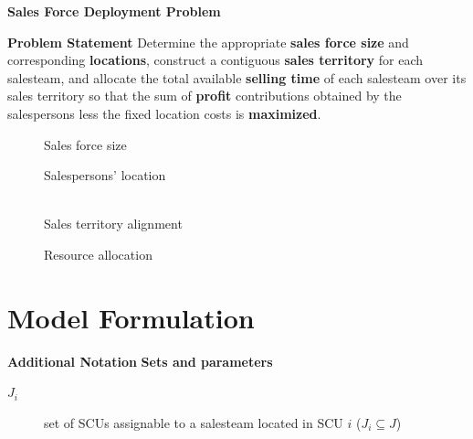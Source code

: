 \documentclass[xcolor=dvipsnames,aspectratio=169, handout, mathserif]{beamer}
\begin{document}
\begin{frame}{\textbf{Sales Force Deployment Problem}}
\begin{block}{\textbf{Problem Statement}}
Determine the appropriate \textbf{sales force size} and corresponding \textbf{locations}, construct a
contiguous \textbf{sales territory} for each salesteam, and allocate the total available
\textbf{selling time} of each salesteam over its sales territory so that the sum of \textbf{profit}
contributions obtained by the salespersons less the fixed location costs is \textbf{maximized}.
\end{block}
\begin{figure}
\centering
 \begin{minipage}[b]{0.2\linewidth} \centering
  
	\footnotesize Sales force size 
 \end{minipage}
 \begin{minipage}[b]{0.2\linewidth} \centering
	
	\footnotesize Salespersons' location
	\end{minipage}
	\begin{minipage}[b]{0.25\linewidth} \centering
	\\
	\footnotesize Sales territory alignment
	\end{minipage}
	\begin{minipage}[b]{0.2\linewidth} \centering
	
	\footnotesize Resource allocation
	\end{minipage}
\end{figure}
\end{frame}


\section{Model Formulation}

\begin{frame}{\textbf{Additional Notation}}
\textbf{Sets and parameters}
\begin{description}
	\item[$J_i$]     set of SCUs assignable to a salesteam located in SCU $i$ ($J_i \subseteq J$)
\end{description}
\end{frame}
\end{document}
